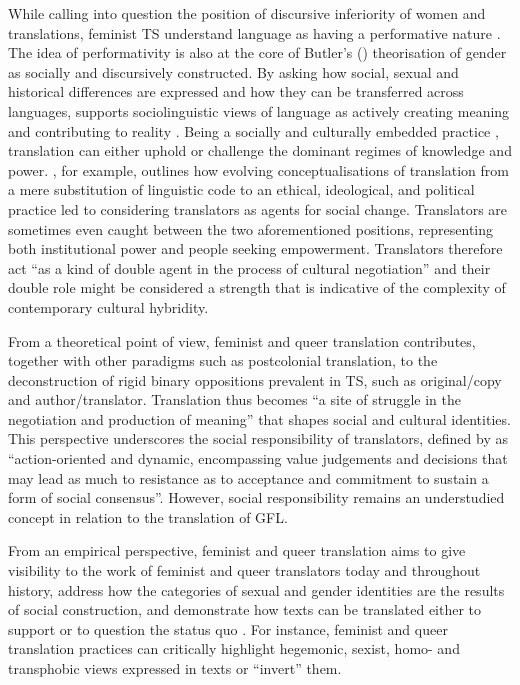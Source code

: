 While calling into question the position of discursive inferiority of women and translations, feminist TS understand language as having a performative nature \citep[2]{simon1996gender}. The idea of performativity is also at the core of Butler's (\cite*{butler1990gender}) theorisation of gender as socially and discursively constructed. By asking how social, sexual and historical differences are expressed and how they can be transferred across languages, \textcite{simon1996gender} supports sociolinguistic views of language as actively creating meaning and contributing to reality \citep{fairclough2015language}. Being a socially and culturally embedded practice \citep{wolf2007sociology}, translation can either uphold or challenge the dominant regimes of knowledge and power. \textcite{tymoczko2010translation}, for example, outlines how evolving conceptualisations of translation from a mere substitution of linguistic code to an ethical, ideological, and political practice led to considering translators as agents for social change. Translators are sometimes even caught between the two aforementioned positions, representing both institutional power and people seeking empowerment. Translators therefore act ``as a kind of double agent in the process of cultural negotiation'' \citep[xix]{tymoczko2002introduction} and their double role might be considered a strength that is indicative of the complexity of contemporary cultural hybridity.

From a theoretical point of view, feminist and queer translation contributes, together with other paradigms such as postcolonial translation, to the deconstruction of rigid binary oppositions prevalent in TS, such as original/copy and author/translator. Translation thus becomes ``a site of struggle in the negotiation and production of meaning'' \citep[176]{spurlin2017queering} that shapes social and cultural identities. This perspective underscores the social responsibility of translators, defined by \textcite[122]{drugan2017translation} as ``action-oriented and dynamic, encompassing value judgements and decisions that may lead as much to resistance as to acceptance and commitment to sustain a form of social consensus''. However, social responsibility remains an understudied concept in relation to the translation of GFL. 

From an empirical perspective, feminist and queer translation aims to give visibility to the work of feminist and queer translators today and throughout history, address how the categories of sexual and gender identities are the results of social construction, and demonstrate how texts can be translated either to support or to question the status quo \citep{simon1996gender,von2016translation,burton2010inverting,epstein2017eradicalization}. For instance, feminist and queer translation practices can critically highlight hegemonic, sexist, homo- and transphobic views expressed in texts or ``invert'' \citep[57]{burton2010inverting} them.

